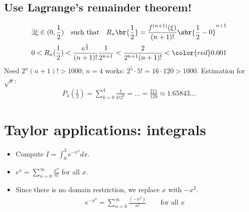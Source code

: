     \subsection*{Use Lagrange's remainder theorem!}
    \begin{align*}
\exists \xi \in (0, \frac{1}{2}) \quad \text{such that} \quad R_{n} \br{\frac{1}{2}} = \frac{f^{(n+1)} (\xi)}{(n+1)!} \sbr{\frac{1}{2} - 0}^{n+1} \\
0 < R_n(\frac{1}{2}) < \frac{  e ^{\frac{1}{2}}  }{(n+1)!} \frac{1}{2 ^{n+1} } < \frac{2}{2 ^{n+1} (n+1) !} < {\color{red} 0.001}
    \end{align*}
Need \(2 ^{n} (n + 1) ! > 1000\); \(n = 4\) works: \(2^5 \cdot 5! = 16 \cdot 120 > 1000\).
Estimation for \(\sqrt{e}\): \begin{align*}
P_4 (\frac{1}{2}) = \sum_{k = 0}^{4} \frac{1}{k! 2^k} = \dots = \frac{211}{128} \approx 1.65843\dots
\end{align*}



\newpage
\section{Taylor applications: integrals}
\begin{itemize}
    \item Compute \(I = \int_{0}^{3} {e^{-x^2}} dx \).
    \item \(e^x = \sum_{n = 0}^{\infty} \frac{x^n}{n!}\) for all \(x\).
    \item Since there is no domain restriction, we replace \(x\) with \(-x^2\). \begin{align*}
        e^{-x^2} = \sum_{n = 0}^{\infty} \frac{(-x^2)}{n!} \qquad \text{for all } x
    \end{align*}
\end{itemize}

